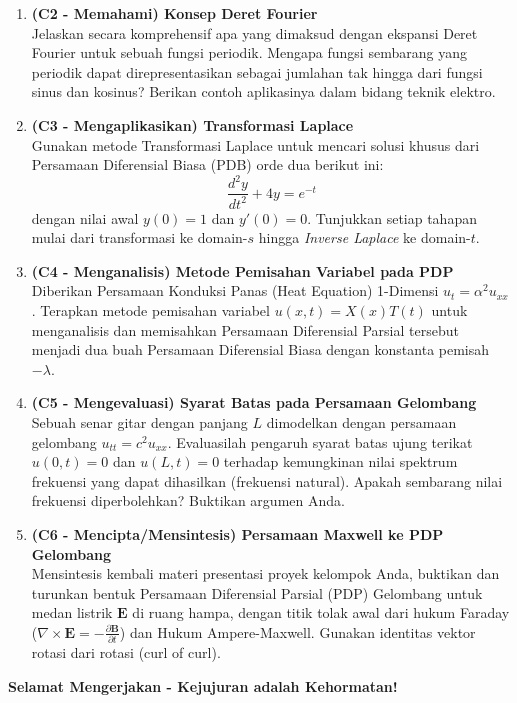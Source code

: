 \documentclass[11pt,a4paper]{article}
\begin{document}
\begin{enumerate}[label=\textbf{\arabic*.}]
    \item \textbf{(C2 - Memahami) Konsep Deret Fourier}\\
    Jelaskan secara komprehensif apa yang dimaksud dengan ekspansi Deret Fourier untuk sebuah fungsi periodik. Mengapa fungsi sembarang yang periodik dapat direpresentasikan sebagai jumlahan tak hingga dari fungsi sinus dan kosinus? Berikan contoh aplikasinya dalam bidang teknik elektro.

    \vspace{4.5cm}
    
    \item \textbf{(C3 - Mengaplikasikan) Transformasi Laplace}\\
    Gunakan metode Transformasi Laplace untuk mencari solusi khusus dari Persamaan Diferensial Biasa (PDB) orde dua berikut ini:
    $$ \frac{d^2y}{dt^2} + 4y = e^{-t} $$
    dengan nilai awal $y(0) = 1$ dan $y'(0) = 0$. Tunjukkan setiap tahapan mulai dari transformasi ke domain-$s$ hingga \textit{Inverse Laplace} ke domain-$t$.

    \vspace{6.5cm}
    
    \item \textbf{(C4 - Menganalisis) Metode Pemisahan Variabel pada PDP}\\
    Diberikan Persamaan Konduksi Panas (Heat Equation) 1-Dimensi $u_t = \alpha^2 u_{xx}$. Terapkan metode pemisahan variabel $u(x,t) = X(x)T(t)$ untuk menganalisis dan memisahkan Persamaan Diferensial Parsial tersebut menjadi dua buah Persamaan Diferensial Biasa dengan konstanta pemisah $-\lambda$.

    \vspace{6.5cm}
    
    \item \textbf{(C5 - Mengevaluasi) Syarat Batas pada Persamaan Gelombang}\\
    Sebuah senar gitar dengan panjang $L$ dimodelkan dengan persamaan gelombang $u_{tt} = c^2 u_{xx}$. Evaluasilah pengaruh syarat batas ujung terikat $u(0,t)=0$ dan $u(L,t)=0$ terhadap kemungkinan nilai spektrum frekuensi yang dapat dihasilkan (frekuensi natural). Apakah sembarang nilai frekuensi diperbolehkan? Buktikan argumen Anda.

    \vspace{6.5cm}

    \item \textbf{(C6 - Mencipta/Mensintesis) Persamaan Maxwell ke PDP Gelombang}\\
    Mensintesis kembali materi presentasi proyek kelompok Anda, buktikan dan turunkan bentuk Persamaan Diferensial Parsial (PDP) Gelombang untuk medan listrik $\mathbf{E}$ di ruang hampa, dengan titik tolak awal dari hukum Faraday ($\nabla \times \mathbf{E} = -\frac{\partial \mathbf{B}}{\partial t}$) dan Hukum Ampere-Maxwell. Gunakan identitas vektor rotasi dari rotasi (curl of curl).
    
\end{enumerate}

\vfill
\begin{center}
\textbf{Selamat Mengerjakan - Kejujuran adalah Kehormatan!}
\end{center}
\end{document}
